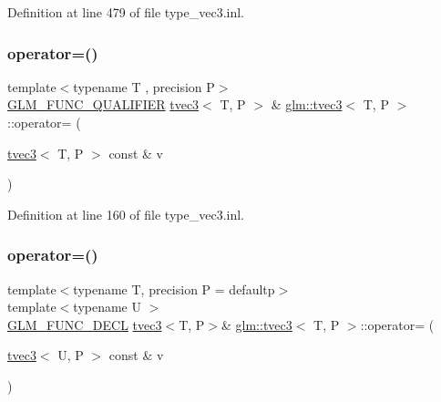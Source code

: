 Definition at line 479 of file type\+\_\+vec3.\+inl.

\mbox{\label{structglm_1_1tvec3_ad790b1fabd3d2c5e77324f6812be2e1b}} 
\subsubsection{\texorpdfstring{operator=()}{operator=()}\hspace{0.1cm}{\footnotesize\ttfamily [1/3]}}
{\footnotesize\ttfamily template$<$typename T , precision P$>$ \\
\mbox{\hyperlink{setup_8hpp_a33fdea6f91c5f834105f7415e2a64407}{G\+L\+M\+\_\+\+F\+U\+N\+C\+\_\+\+Q\+U\+A\+L\+I\+F\+I\+ER}} \mbox{\hyperlink{structglm_1_1tvec3}{tvec3}}$<$ T, P $>$ \& \mbox{\hyperlink{structglm_1_1tvec3}{glm\+::tvec3}}$<$ T, P $>$\+::operator= (\begin{DoxyParamCaption}\item[{\mbox{\hyperlink{structglm_1_1tvec3}{tvec3}}$<$ T, P $>$ const \&}]{v }\end{DoxyParamCaption})}



Definition at line 160 of file type\+\_\+vec3.\+inl.

\mbox{\label{structglm_1_1tvec3_aff4967c521c4bc8f009eed5db29c9406}} 
\subsubsection{\texorpdfstring{operator=()}{operator=()}\hspace{0.1cm}{\footnotesize\ttfamily [2/3]}}
{\footnotesize\ttfamily template$<$typename T, precision P = defaultp$>$ \\
template$<$typename U $>$ \\
\mbox{\hyperlink{setup_8hpp_ab2d052de21a70539923e9bcbf6e83a51}{G\+L\+M\+\_\+\+F\+U\+N\+C\+\_\+\+D\+E\+CL}} \mbox{\hyperlink{structglm_1_1tvec3}{tvec3}}$<$T, P$>$\& \mbox{\hyperlink{structglm_1_1tvec3}{glm\+::tvec3}}$<$ T, P $>$\+::operator= (\begin{DoxyParamCaption}\item[{\mbox{\hyperlink{structglm_1_1tvec3}{tvec3}}$<$ U, P $>$ const \&}]{v }\end{DoxyParamCaption})}

